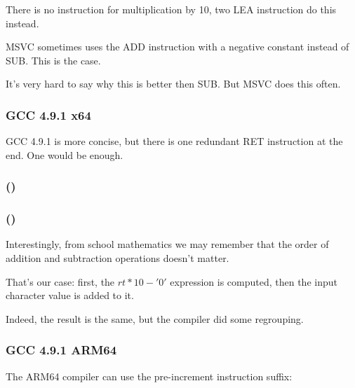 There is no instruction for multiplication by 10, two LEA instruction do this instead.

MSVC sometimes uses the ADD instruction with a negative constant instead of SUB.
This is the case.

It's very hard to say why this is better then SUB.
But MSVC does this often.

\subsubsection{\Optimizing GCC 4.9.1 x64}

\Optimizing GCC 4.9.1 is more concise, but there is one redundant RET instruction at the end.
One would be enough.



\subsubsection{\OptimizingKeilVI (\ARMMode)}



\subsubsection{\OptimizingKeilVI (\ThumbMode)}



Interestingly, from school mathematics we may remember that the order of addition and 
subtraction operations doesn't matter.

That's our case: first, the $rt*10 - '0'$ expression is computed, then the input character value 
is added to it.

Indeed, the result is the same, but the compiler did some regrouping.

\subsubsection{\Optimizing GCC 4.9.1 ARM64}

The ARM64 compiler can use the pre-increment instruction suffix:



